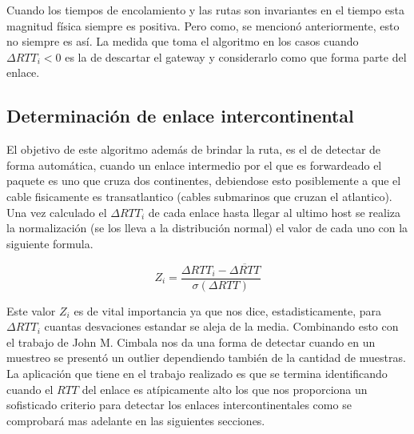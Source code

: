 Cuando los tiempos de encolamiento y las rutas son invariantes en el tiempo
esta magnitud física siempre es positiva. Pero como, se mencionó anteriormente, esto
no siempre es así. La medida que toma el algoritmo en los casos cuando
$\Delta RTT_{i} < 0$ es la de descartar el
gateway y considerarlo como que forma parte del enlace.

\subsection{Determinación de enlace intercontinental}

El objetivo de este algoritmo además de brindar la ruta, es el de detectar de
forma automática, cuando un enlace intermedio por el que es forwardeado el
paquete es uno que cruza dos continentes, debiendose esto posiblemente a
que el cable fisicamente es transatlantico (cables submarinos que cruzan el
atlantico). Una vez calculado el $\Delta RTT_{i}$ de cada enlace hasta llegar
al ultimo host se realiza la normalización (se los lleva a la distribución normal)
el valor de cada uno con la siguiente formula.

\begin{equation}
	Z_{i} = \frac{\Delta RTT_{i} - \overline{\Delta RTT}}{\sigma \left(\Delta RTT \right)}
\end{equation}

Este valor $Z_{i}$ es de vital importancia ya que nos dice, estadisticamente,
para $\Delta RTT_{i}$ cuantas desvaciones estandar se aleja de la media.
Combinando esto con el trabajo de John M. Cimbala\cite{cimbala} nos da una forma de
detectar cuando en un muestreo se presentó un outlier dependiendo también de la
cantidad de muestras. La aplicación que tiene en el trabajo realizado es que se
termina identificando cuando el $RTT$ del enlace es atípicamente alto los que nos
proporciona un sofisticado criterio para detectar los enlaces
intercontinentales como se comprobará mas adelante en las siguientes secciones.
